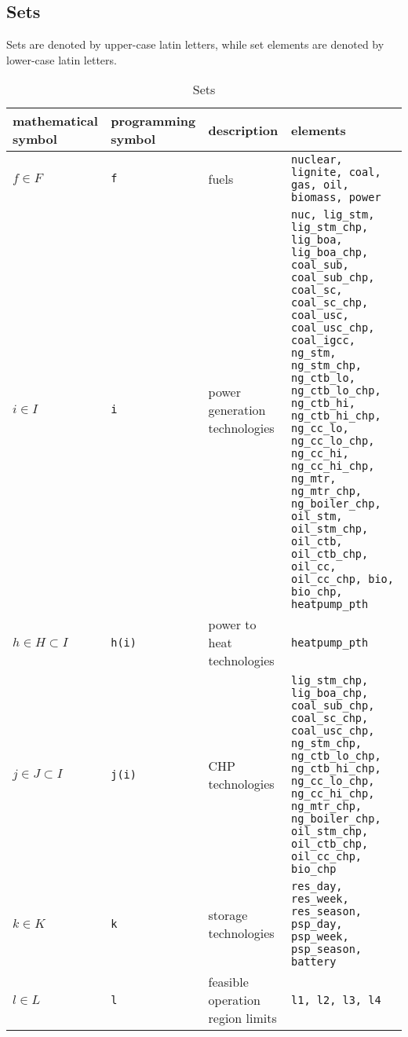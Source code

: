\documentclass[final, 3p, times]{elsarticle} %
\begin{document}
    \subsection{Sets} \label{sets}
    Sets are denoted by upper-case latin letters, while set elements are denoted by lower-case latin letters.

    \begin{table}
        \caption{Sets}
        \begin{tabulary}{\textwidth}{LLLp{6cm}}
            \toprule
            mathematical symbol & programming symbol & description & elements                                                      \\
            \midrule
            $f \in F$             & \texttt{f}         & fuels & \texttt{nuclear, lignite, coal, gas, oil, biomass, power}     \\
            $i \in I$             & \texttt{i}         & power generation technologies & \texttt{nuc, lig\_stm, lig\_stm\_chp, lig\_boa, lig\_boa\_chp,
            coal\_sub, coal\_sub\_chp, coal\_sc, coal\_sc\_chp, coal\_usc,
            coal\_usc\_chp, coal\_igcc, ng\_stm, ng\_stm\_chp, ng\_ctb\_lo,
            ng\_ctb\_lo\_chp, ng\_ctb\_hi, ng\_ctb\_hi\_chp, ng\_cc\_lo,
            ng\_cc\_lo\_chp, ng\_cc\_hi, ng\_cc\_hi\_chp, ng\_mtr,
            ng\_mtr\_chp, ng\_boiler\_chp, oil\_stm, oil\_stm\_chp,
            oil\_ctb, oil\_ctb\_chp, oil\_cc, oil\_cc\_chp, bio,
            bio\_chp, heatpump\_pth}                                        \\
            $h \in H \subset I$     & \texttt{h(i)}    & power to heat technologies & \texttt{heatpump\_pth}                                        \\
            $j \in J \subset I$     & \texttt{j(i)}    & CHP technologies & \texttt{lig\_stm\_chp, lig\_boa\_chp, coal\_sub\_chp,
            coal\_sc\_chp, coal\_usc\_chp, ng\_stm\_chp, ng\_ctb\_lo\_chp,
            ng\_ctb\_hi\_chp, ng\_cc\_lo\_chp, ng\_cc\_hi\_chp,
            ng\_mtr\_chp, ng\_boiler\_chp,
            oil\_stm\_chp, oil\_ctb\_chp, oil\_cc\_chp, bio\_chp}           \\
            $k \in K$               & \texttt{k}       & storage technologies & \texttt{res\_day, res\_week, res\_season, psp\_day,
            psp\_week, psp\_season, battery}                                \\
            $l \in L$               & \texttt{l}       & feasible operation region limits & \texttt{l1, l2, l3, l4}                                       \\

\end{tabulary}
\end{table}
\end{document}
